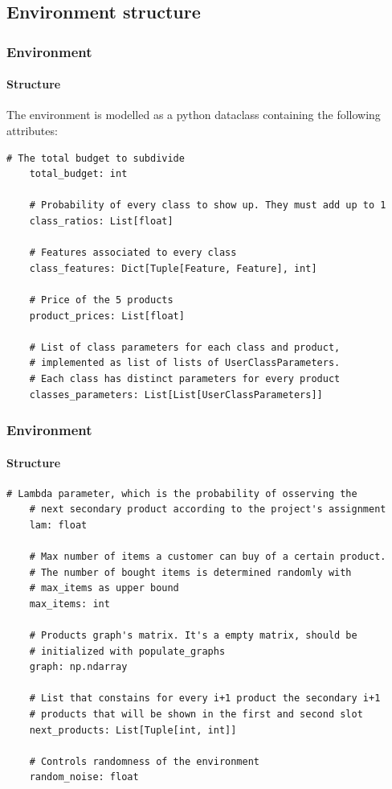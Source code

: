 
\subsection{Environment structure}


\begin{frame}[fragile]

\frametitle{Environment}
\framesubtitle{Structure}

The environment is modelled as a python dataclass containing the following attributes:

\begin{lstlisting}[style=Python, basicstyle=\tiny, numbers=none, framexrightmargin=-20pt]
    # The total budget to subdivide
    total_budget: int

    # Probability of every class to show up. They must add up to 1
    class_ratios: List[float]

    # Features associated to every class
    class_features: Dict[Tuple[Feature, Feature], int]

    # Price of the 5 products
    product_prices: List[float]

    # List of class parameters for each class and product,
    # implemented as list of lists of UserClassParameters.
    # Each class has distinct parameters for every product
    classes_parameters: List[List[UserClassParameters]]
\end{lstlisting}

\end{frame}


\begin{frame}[fragile]

\frametitle{Environment}
\framesubtitle{Structure}

\begin{lstlisting}[style=Python, basicstyle=\tiny, numbers=none, framexrightmargin=-20pt]
    # Lambda parameter, which is the probability of osserving the
    # next secondary product according to the project's assignment
    lam: float

    # Max number of items a customer can buy of a certain product.
    # The number of bought items is determined randomly with
    # max_items as upper bound
    max_items: int

    # Products graph's matrix. It's a empty matrix, should be
    # initialized with populate_graphs
    graph: np.ndarray

    # List that constains for every i+1 product the secondary i+1
    # products that will be shown in the first and second slot
    next_products: List[Tuple[int, int]]

    # Controls randomness of the environment
    random_noise: float
\end{lstlisting}

\end{frame}

